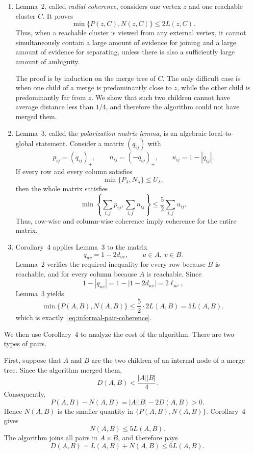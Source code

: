 \documentclass[11pt]{article}
\begin{document}
\begin{enumerate}
    \item
    Lemma~2, called \emph{radial coherence}, considers one vertex $z$ and
    one reachable cluster $C$.  It proves
    \[
        \min\{P(z,C),N(z,C)\}\le 2L(z,C).
    \]
    Thus, when a reachable cluster is viewed from any external vertex, it
    cannot simultaneously contain a large amount of evidence for joining
    and a large amount of evidence for separating, unless there is also a
    sufficiently large amount of ambiguity.

    The proof is by induction on the merge tree of $C$.  The only difficult
    case is when one child of a merge is predominantly close to $z$, while
    the other child is predominantly far from $z$.  We show that such two
    children cannot have average distance less than $1/4$, and therefore the
    algorithm could not have merged them.

    \item
    Lemma~3, called the \emph{polarization matrix lemma}, is an algebraic
    local-to-global statement.  Consider a matrix $(q_{ij})$ with
    \[
        p_{ij}=(q_{ij})_+,\qquad
        n_{ij}=(-q_{ij})_+,\qquad
        u_{ij}=1-|q_{ij}|.
    \]
    If every row and every column satisfies
    \[
        \min\{P_\lambda,N_\lambda\}\le U_\lambda,
    \]
    then the whole matrix satisfies
    \[
        \min\left\{\sum_{i,j}p_{ij},\sum_{i,j}n_{ij}\right\}
        \le \frac52\sum_{i,j}u_{ij}.
    \]
    Thus, row-wise and column-wise coherence imply coherence for the entire
    matrix.

    \item
    Corollary~4 applies Lemma~3 to the matrix
    \[
        q_{uv}=1-2d_{uv},
        \qquad u\in A,\ v\in B.
    \]
    Lemma~2 verifies the required inequality for every row because $B$ is
    reachable, and for every column because $A$ is reachable.  Since
    \[
        1-|q_{uv}|=1-|1-2d_{uv}|=2\ell_{uv},
    \]
    Lemma~3 yields
    \[
        \min\{P(A,B),N(A,B)\}
        \le \frac52\cdot 2L(A,B)
        =5L(A,B),
    \]
    which is exactly~\eqref{eq:informal-pair-coherence}.
\end{enumerate}

We then use Corollary~4 to analyze the cost of the algorithm.  There are two
types of pairs.

First, suppose that $A$ and $B$ are the two children of an internal node of
a merge tree.  Since the algorithm merged them,
\[
    D(A,B)<\frac{|A||B|}{4}.
\]
Consequently,
\[
    P(A,B)-N(A,B)
    =|A||B|-2D(A,B)
    >0.
\]
Hence $N(A,B)$ is the smaller quantity in
$\{P(A,B),N(A,B)\}$.  Corollary~4 gives
\[
    N(A,B)\le 5L(A,B).
\]
The algorithm joins all pairs in $A\times B$, and therefore pays
\[
    D(A,B)=L(A,B)+N(A,B)\le 6L(A,B).
\]
\end{document}
